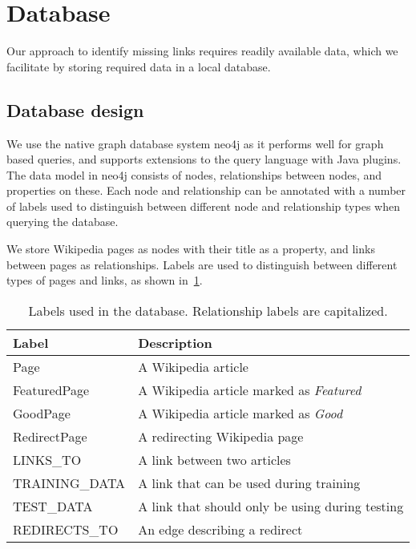 \section{Database} \label{sec:db}
Our approach to identify missing links requires readily available data, which we facilitate by storing required data in a local database.

\subsection{Database design} \label{sec:db_design}
We use the native graph database system neo4j as it performs well for graph based queries, and supports extensions to the query language with Java plugins. The data model in neo4j consists of nodes, relationships between nodes, and properties on these. Each node and relationship can be annotated with a number of labels used to distinguish between different node and relationship types when querying the database.

We store Wikipedia pages as nodes with their title as a property, and links between pages as relationships. Labels are used to distinguish between different types of pages and links, as shown in~\cref{tab:db_labels}.

\begin{table}[tbp]
\centering
\begin{tabular}{@{}ll@{}}
\toprule
\textbf{Label}         & \textbf{Description}                            \\ \midrule
Page                   & A Wikipedia article                             \\
FeaturedPage           & A Wikipedia article marked as \emph{Featured}   \\
GoodPage               & A Wikipedia article marked as \emph{Good}       \\
RedirectPage           & A redirecting Wikipedia page                    \\ \midrule
LINKS\_TO              & A link between two articles                     \\
TRAINING\_DATA         & A link that can be used during training         \\
TEST\_DATA             & A link that should only be using during testing \\
REDIRECTS\_TO          & An edge describing a redirect                   \\ \bottomrule
\end{tabular}
\caption[Labels used in the database]{Labels used in the database. Relationship labels are capitalized.}
\label{tab:db_labels}
\end{table}

